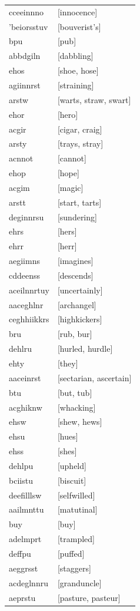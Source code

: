 \documentclass{article}
\begin{document}
\begin{tabular}{ll}
cceeinnno & [innocence] \\
'beiorsstuv & [bouverist's] \\
bpu & [pub] \\
abbdgiln & [dabbling] \\
ehos & [shoe, hose] \\
agiinnrst & [straining] \\
arstw & [warts, straw, swart] \\
ehor & [hero] \\
acgir & [cigar, craig] \\
arsty & [trays, stray] \\
acnnot & [cannot] \\
ehop & [hope] \\
acgim & [magic] \\
arstt & [start, tarts] \\
deginnrsu & [sundering] \\
ehrs & [hers] \\
ehrr & [herr] \\
aegiimns & [imagines] \\
cddeenss & [descends] \\
aceilnnrtuy & [uncertainly] \\
aaceghlnr & [archangel] \\
ceghhiikkrs & [highkickers] \\
bru & [rub, bur] \\
dehlru & [hurled, hurdle] \\
ehty & [they] \\
aaceinrst & [sectarian, ascertain] \\
btu & [but, tub] \\
acghiknw & [whacking] \\
ehsw & [shew, hews] \\
ehsu & [hues] \\
ehss & [shes] \\
dehlpu & [upheld] \\
bciistu & [biscuit] \\
deefilllsw & [selfwilled] \\
aailmnttu & [matutinal] \\
buy & [buy] \\
adelmprt & [trampled] \\
deffpu & [puffed] \\
aeggrsst & [staggers] \\
acdeglnnru & [granduncle] \\
aeprstu & [pasture, pasteur] \\

\end{tabular}
\end{document}
